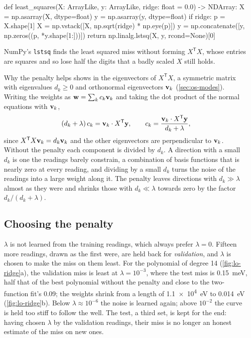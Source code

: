 \begin{code}
def least_squares(X: ArrayLike, y: ArrayLike, ridge: float = 0.0) -> NDArray:
    X = np.asarray(X, dtype=float)
    y = np.asarray(y, dtype=float)
    if ridge:
        p = X.shape[1]
        X = np.vstack([X, np.sqrt(ridge) * np.eye(p)])
        y = np.concatenate([y, np.zeros((p, *y.shape[1:]))])
    return np.linalg.lstsq(X, y, rcond=None)[0]
\end{code}

\noindent NumPy's \texttt{lstsq} finds the least squared miss without
forming $X^{\mathsf T}X$, whose entries are squares and so lose half the
digits that a badly scaled $X$ still holds.

Why the penalty helps shows in the eigenvectors of $X^{\mathsf T}X$, a
symmetric matrix with eigenvalues $d_k \ge 0$ and orthonormal eigenvectors
$\bm{\mathrm{v}}_k$ (\cref{sec:os-modes}). Writing the weights as $\bm{\mathrm{w}} =
\sum_kc_k\bm{\mathrm{v}}_k$ and taking the dot product of the normal equations with
$\bm{\mathrm{v}}_k$,
\begin{equation*}
   (d_k + \lambda)\,c_k = \bm{\mathrm{v}}_k\cdot X^{\mathsf T}\bm{\mathrm{y}} , \qquad
   c_k = \frac{\bm{\mathrm{v}}_k\cdot X^{\mathsf T}\bm{\mathrm{y}}}{d_k + \lambda} ,
\end{equation*}
since $X^{\mathsf T}X\bm{\mathrm{v}}_k = d_k\bm{\mathrm{v}}_k$ and the other eigenvectors
are perpendicular to $\bm{\mathrm{v}}_k$. Without the penalty each component is
divided by $d_k$. A direction with a small $d_k$ is one the readings
barely constrain, a combination of basis functions that is nearly zero at
every reading, and dividing by a small $d_k$ turns the noise of the
readings into a large weight along it. The penalty leaves directions with
$d_k \gg \lambda$ almost as they were and shrinks those with $d_k \ll
\lambda$ towards zero by the factor $d_k/(d_k + \lambda)$.

\subsection*{Choosing the penalty}

$\lambda$ is not learned from the training readings, which always prefer
$\lambda = 0$. Fifteen more readings, drawn as the first were, are held
back for \emph{validation}, and $\lambda$ is chosen to make the miss on
them least. For the polynomial of degree 14 (\cref{fig:lo-ridge}a), the
validation miss is least at $\lambda = 10^{-3}$, where the test miss is
\SI{0.15}{\milli\electronvolt}, half that of the best polynomial without
the penalty and close to the two-function fit's 0.09; the weights shrink
from a length of \SI{1.1e4}{\electronvolt} to \SI{0.014}{\electronvolt}
(\cref{fig:lo-ridge}b). Below $\lambda \approx 10^{-6}$ the noise is
learned again; above $10^{-2}$ the curve is held too stiff to follow the
well. The test, a third set, is kept for the end: having chosen
$\lambda$ by the validation readings, their miss is no longer an honest
estimate of the miss on new ones.

